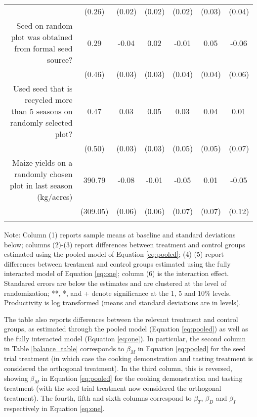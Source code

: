 \documentclass[english]{article}\usepackage[]{graphicx}\usepackage[]{xcolor}
\begin{document}
\begin{sidewaystable}
\begin{center}
\begin{tabular}{rcccccc}
& (0.26) & (0.02)  & (0.02) & (0.02)  & (0.03)  & (0.04)
 \\

Seed on random plot was obtained from formal seed source? 
& 0.29
& -0.04$^{}$
& 0.02$^{}$ 
& -0.01$^{}$ 
& 0.05$^{}$
& -0.06$^{}$ \\

& (0.46) & (0.03)  & (0.03) & (0.04)  & (0.04)  & (0.06)
 \\
Used seed that is recycled more than 5 seasons on randomly selected plot? 
& 0.47
& 0.03$^{}$
& 0.05$^{}$ 
& 0.03$^{}$ 
& 0.04$^{}$
& 0.01$^{}$ \\

& (0.50) & (0.03)  & (0.03) & (0.05)  & (0.05)  & (0.07)
 \\

Maize yields on a randomly chosen plot in last season (kg/acres)
& 390.79
& -0.08$^{}$
& -0.01$^{}$ 
& -0.05$^{}$ 
& 0.01$^{}$
& -0.05$^{}$ \\

& (309.05) & (0.06)  & (0.06) & (0.07)  & (0.07)  & (0.12)
 \\
\\
\hline\hline
\end{tabular}
\end{center}
\scriptsize
Note: Column (1) reports sample means at baseline and standard deviations below;  columns (2)-(3) report differences between treatment and control groups estimated using the pooled model of Equation  \ref{eq:pooled}; (4)-(5) report differences between treatment and control groups estimated using the fully interacted model of Equation \ref{eq:one}; column (6) is the interaction effect. Standared errors are below the estimates and are clustered at the level of randomization; **, *, and + denote significance at the 1, 5 and 10\% levels. Productivity is log transformed (means and standard deviations are in levels).
\end{sidewaystable}

The table also reports differences between the relevant treatment
and control groups, as estimated through the pooled model (Equation
\ref{eq:pooled}) as well as the fully interacted model (Equation
\ref{eq:one}). In particular, the second column in Table \ref{balance_table}
corresponds to $\beta_{M}$ in Equation \ref{eq:pooled} for the seed
trial treatment (in which case the cooking demonstration and tasting
treatment is considered the orthogonal treatment). In the third column,
this is reversed, showing $\beta_{M}$ in Equation \ref{eq:pooled}
for the cooking demonstration and tasting treatment (with the seed
trial treatment now considered the orthogonal treatment). The fourth,
fifth and sixth columns correspond to $\beta_{T}$, $\beta_{D}$ and
$\beta_{I}$ respectively in Equation \ref{eq:one}.
\end{document}
